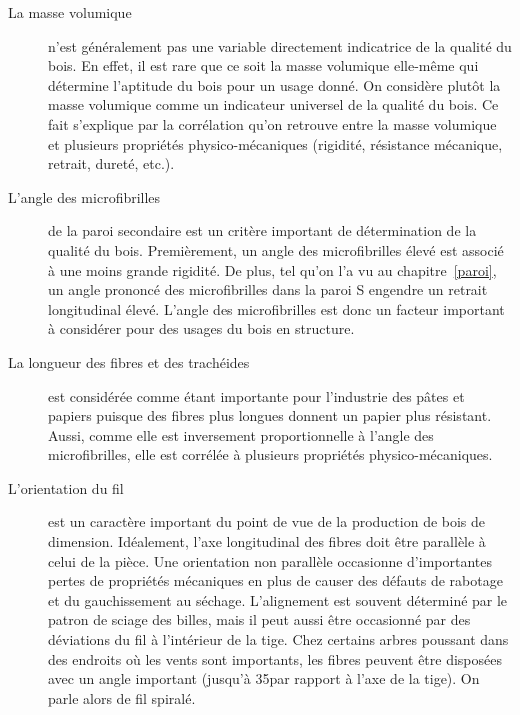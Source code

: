 \begin{description}
	\item[La masse volumique] n'est généralement pas une variable directement indicatrice de la qualité du bois. En effet, il est rare que ce soit la masse volumique elle-même qui détermine l'aptitude du bois pour un usage donné. On considère plutôt la masse volumique comme un indicateur \og universel \fg de la qualité du bois. Ce fait s'explique par la corrélation qu'on retrouve entre la masse volumique et plusieurs propriétés physico-mécaniques (rigidité, résistance mécanique, retrait, dureté, etc.).
	\item[L'angle des microfibrilles] de la paroi secondaire est un critère important de détermination de la qualité du bois. Premièrement, un angle des microfibrilles élevé est associé à une moins grande rigidité. De plus, tel qu’on l’a vu au chapitre~\ref{paroi}, un angle prononcé des microfibrilles dans la paroi S engendre un retrait longitudinal élevé. L'angle des microfibrilles est donc un facteur important à considérer pour des usages du bois en structure.
	\item[La longueur des fibres et des trachéides] est considérée comme étant importante pour l'industrie des pâtes et papiers puisque des fibres plus longues donnent un papier plus résistant. Aussi, comme elle est inversement proportionnelle à l'angle des microfibrilles, elle est corrélée à plusieurs propriétés physico-mécaniques.
	\item[L'orientation du fil] est un caractère important du point de vue de la production de bois de dimension. Idéalement, l’axe longitudinal des fibres doit être parallèle à celui de la pièce. Une orientation non parallèle occasionne d'importantes pertes de propriétés mécaniques en plus de causer des défauts de rabotage et du gauchissement au séchage. L'alignement est souvent déterminé par le patron de sciage des billes, mais il peut aussi être occasionné par des déviations du fil à l'intérieur de la tige. Chez certains arbres poussant dans des endroits où les vents sont importants, les fibres peuvent être disposées avec un angle important (jusqu’à 35\degre par rapport à l’axe de la tige). On parle alors de fil spiralé. 

\end{description}
